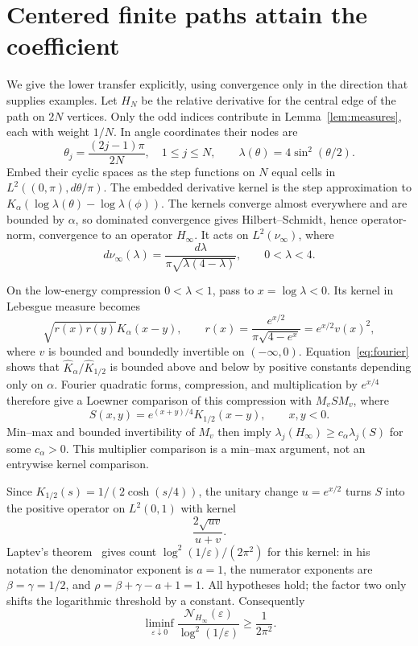 \documentclass[11pt]{article}
\newcommand{\N}{\mathcal N}
\begin{document}
\section{Centered finite paths attain the coefficient}
We give the lower transfer explicitly, using convergence only in the
direction that supplies examples. Let $H_N$ be the relative derivative
for the central edge of the path on $2N$ vertices.
Only the odd indices contribute in Lemma~\ref{lem:measures}, each
with weight $1/N$. In angle coordinates their nodes are
\[
 \theta_j=\frac{(2j-1)\pi}{2N},\quad 1\le j\le N,
 \qquad \lambda(\theta)=4\sin^2(\theta/2).
\]
Embed their cyclic spaces as the step functions on $N$ equal cells
in $L^2((0,\pi),d\theta/\pi)$. The embedded derivative kernel is the
step approximation to
$K_\alpha(\log\lambda(\theta)-\log\lambda(\phi))$.
The kernels converge almost everywhere and are bounded by $\alpha$,
so dominated convergence gives Hilbert--Schmidt, hence operator-norm,
convergence to an operator $H_\infty$.
It acts on $L^2(\nu_\infty)$, where
\[
 d\nu_\infty(\lambda)
        =\frac{d\lambda}{\pi\sqrt{\lambda(4-\lambda)}},
                      \qquad 0<\lambda<4.
\]

On the low-energy compression $0<\lambda<1$, pass to
$x=\log\lambda<0$. Its kernel in Lebesgue measure becomes
\[
 \sqrt{r(x)r(y)}K_\alpha(x-y),\qquad
 r(x)=\frac{e^{x/2}}{\pi\sqrt{4-e^x}}
      =e^{x/2}v(x)^2,
\]
where $v$ is bounded and boundedly invertible on $(-\infty,0)$.
Equation~\eqref{eq:fourier} shows that
$\widehat K_\alpha/\widehat K_{1/2}$ is bounded above and below
by positive constants depending only on $\alpha$. Fourier quadratic
forms, compression, and multiplication by $e^{x/4}$ therefore give
a Loewner comparison of this compression with $M_v S M_v$, where
\[
                     S(x,y)=e^{(x+y)/4}K_{1/2}(x-y),\qquad x,y<0.
\]
Min--max and bounded invertibility of $M_v$ then imply
$\lambda_j(H_\infty)\ge c_\alpha\lambda_j(S)$ for some
$c_\alpha>0$. This multiplier comparison is a min--max argument,
not an entrywise kernel comparison.

Since $K_{1/2}(s)=1/(2\cosh(s/4))$, the unitary change
$u=e^{x/2}$ turns $S$ into the positive operator on $L^2(0,1)$
with kernel
\[
                              \frac{2\sqrt{uv}}{u+v}.
\]
Laptev's theorem~\cite[Theorem (3), p.~1039]{Laptev} gives count
$\log^2(1/\varepsilon)/(2\pi^2)$ for this kernel: in his notation
the denominator exponent is $a=1$, the numerator exponents are
$\beta=\gamma=1/2$, and
$\rho=\beta+\gamma-a+1=1$. All hypotheses hold; the factor two
only shifts the logarithmic threshold by a constant. Consequently
\begin{equation}\label{eq:inflower}
 \liminf_{\varepsilon\downarrow0}
 \frac{\N_{H_\infty}(\varepsilon)}{\log^2(1/\varepsilon)}
                          \ge\frac1{2\pi^2}.
\end{equation}
\end{document}
